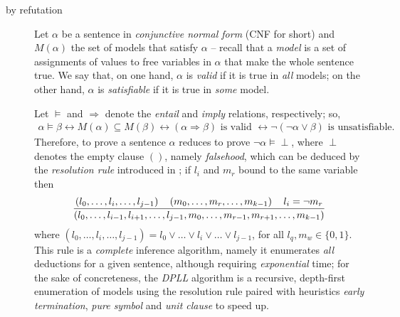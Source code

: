 \documentclass[a4paper,12pt]{article}
\begin{document}
\begin{description}

\item[by refutation] Let $\alpha$ be a sentence in \emph{conjunctive normal
form} (CNF for short) and $M(\alpha)$ the set of models that satisfy $\alpha$
-- recall that a \emph{model} is a set of assignments of values to free
variables in $\alpha$ that make the whole sentence true.  We say that, on one
hand, $\alpha$ is \textit{valid} if it is true in \textit{all} models; on the
other hand, $\alpha$ is \textit{satisfiable} if it is true in \textit{some}
model.

Let $\models$ and $\Rightarrow$ denote the \textit{entail} and \textit{imply}
relations, respectively; so,
\begin{displaymath}
\begin{split}
\alpha \models \beta \leftrightarrow
M(\alpha) \subseteq M(\beta) \leftrightarrow
(\alpha \Rightarrow \beta) \text{ is valid } \leftrightarrow
\neg(\neg\alpha \vee \beta) \text{ is unsatisfiable.}
\end{split}
\end{displaymath}
Therefore, to prove a sentence $\alpha$ reduces to prove
$\neg\alpha\models\perp$, where $\perp$ denotes the empty clause $()$, namely
\textit{falsehood}, which can be deduced by the \textit{resolution rule}
introduced in \citep{Robinson:1965:MLB:321250.321253}; if $l_{i}$ and $m_{r}$
bound to the same variable then
\begin{displaymath}
{\left(l_{0}, \ldots, l_{i}, \ldots, l_{j-1}\right) \quad \left(m_{0}, \ldots, m_{r},\ldots, m_{k-1}\right) \quad l_{i} = \neg m_{r}
\over
\left(l_{0},\ldots, l_{i-1},l_{i+1}, \ldots,l_{j-1}, m_{0},\ldots, m_{r-1},m_{r+1},\ldots, m_{k-1}\right)}
\end{displaymath}
where $\left(l_{0},\ldots, l_{i}, \ldots, l_{j-1}\right) = l_{0}\vee \ldots
\vee l_{i} \vee \ldots \vee l_{j-1}$, for all $l_{q}, m_{w} \in\lbrace 0,1\rbrace$.
This rule is a \textit{complete} inference algorithm, namely it enumerates
\emph{all} deductions for a given sentence, although requiring
\emph{exponential} time; for the sake of concreteness, the \textit{DPLL}
algorithm \citep{Davis:1962:MPT:368273.368557}
is a recursive, depth-first enumeration of models using the
resolution rule paired with heuristics \textit{early termination},
\textit{pure symbol} and \textit{unit clause} to speed up.


\end{description}
\end{document}
